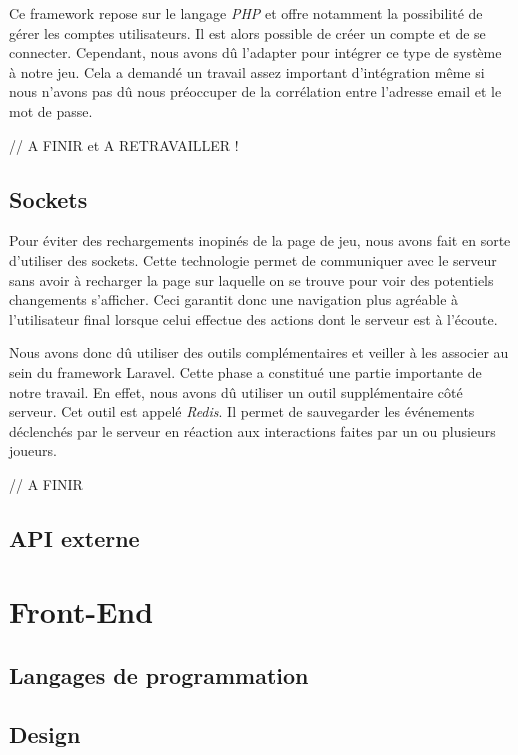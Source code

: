 \documentclass{tnreport}
\begin{document}
Ce framework repose sur le langage \textit{PHP} et offre notamment la possibilité de gérer les comptes utilisateurs. Il est alors possible de créer un compte et de se connecter. Cependant, nous avons dû l'adapter pour intégrer ce type de système à notre jeu. Cela a demandé un travail assez important d'intégration même si nous n'avons pas dû nous préoccuper de la corrélation entre l'adresse email et le mot de passe. 

// A FINIR et A RETRAVAILLER !

\subsection{Sockets}

Pour éviter des rechargements inopinés de la page de jeu, nous avons fait en sorte d'utiliser des sockets. Cette technologie permet de communiquer avec le serveur sans avoir à recharger la page sur laquelle on se trouve pour voir des potentiels changements s'afficher. Ceci garantit donc une navigation plus agréable à l'utilisateur final lorsque celui effectue des actions dont le serveur est à l'écoute. 

Nous avons donc dû utiliser des outils complémentaires et veiller à les associer au sein du framework Laravel. Cette phase a constitué une partie importante de notre travail. En effet, nous avons dû utiliser un outil supplémentaire côté serveur. Cet outil est appelé \textit{Redis}. Il permet de sauvegarder les événements déclenchés par le serveur en réaction aux interactions faites par un ou plusieurs joueurs.

// A FINIR

\subsection{API externe}

\section{Front-End}

\subsection{Langages de programmation}

\subsection{Design}
\end{document}
